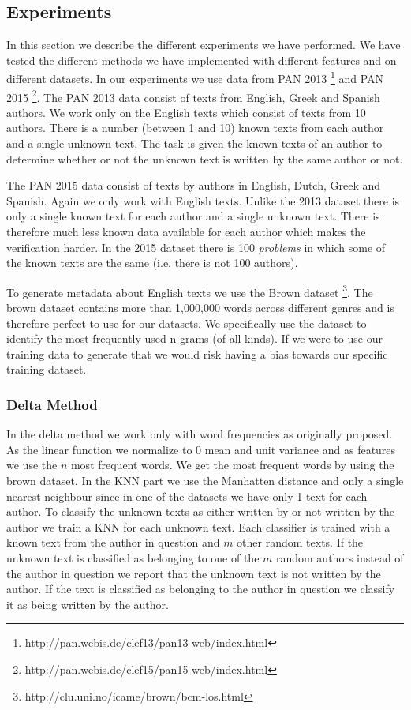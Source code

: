 \subsection{Experiments}
In this section we describe the different experiments we have performed.
We have tested the different methods we have implemented with different
features and on different datasets. In our experiments we use data from PAN
2013 \footnote{http://pan.webis.de/clef13/pan13-web/index.html} and PAN 2015
\footnote{http://pan.webis.de/clef15/pan15-web/index.html}. The PAN 2013 data
consist of texts from English, Greek and Spanish authors. We work only on the
English texts which consist of texts from 10 authors. There is a number (between
1 and 10) known texts from each author and a single unknown text. The task is
given the known texts of an author to determine whether or not the unknown text
is written by the same author or not.

The PAN 2015 data consist of texts by authors in English, Dutch, Greek and
Spanish. Again we only work with English texts. Unlike the 2013 dataset there is
only a single known text for each author and a single unknown text. There is
therefore much less known data available for each author which makes the
verification harder. In the 2015 dataset there is 100 \textit{problems} in which
some of the known texts are the same (i.e. there is not 100 authors).

To generate metadata about English texts we use the Brown dataset
\footnote{http://clu.uni.no/icame/brown/bcm-los.html}. The brown dataset
contains more than 1,000,000 words across different genres and is therefore
perfect to use for our datasets. We specifically use the dataset to identify
the most frequently used n-grams (of all kinds). If we were to use our training
data to generate that we would risk having a bias towards our specific training
dataset.

\subsubsection{Delta Method}
In the delta method we work only with word frequencies as originally proposed.
As the linear function we normalize to 0 mean and unit variance and as features
we use the $n$ most frequent words. We get the most frequent words by using the
brown dataset. In the \gls{KNN} part we use the Manhatten distance and only a
single nearest neighbour since in one of the datasets we have only 1 text for
each author. To classify the unknown texts as either written by or not written
by the author we train a \gls{KNN} for each unknown text. Each classifier is
trained with a known text from the author in question and $m$ other random
texts. If the unknown text is classified as belonging to one of the $m$ random
authors instead of the author in question we report that the unknown text is not
written by the author. If the text is classified as belonging to the author in
question we classify it as being written by the author.

